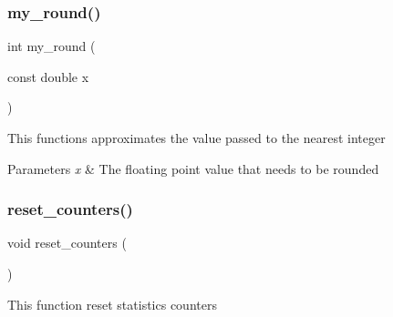 \subsubsection{my\+\_\+round()}
{\footnotesize\ttfamily int my\+\_\+round (\begin{DoxyParamCaption}\item[{const double}]{x }\end{DoxyParamCaption})}

This functions approximates the value passed to the nearest integer


\begin{DoxyParams}{Parameters}
{\em x} & The floating point value that needs to be rounded \\
\hline
\end{DoxyParams}
\mbox{\label{utils_8c_a2640efff1e7b6f9c11615048ba43b0fd}} 
\subsubsection{reset\+\_\+counters()}
{\footnotesize\ttfamily void reset\+\_\+counters (\begin{DoxyParamCaption}{ }\end{DoxyParamCaption})}

This function reset statistics counters 